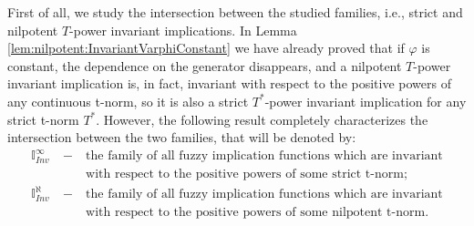 First of all, we study the intersection between the studied families, i.e., strict and nilpotent $T$-power invariant implications. In Lemma \ref{lem:nilpotent:InvariantVarphiConstant} we have already proved that if $\varphi$ is constant, the dependence on the generator disappears, and a nilpotent $T$-power invariant implication is, in fact, invariant with respect to the positive powers of any continuous t-norm, so it is also a strict $T^*$-power invariant implication for any strict t-norm $T^*$. However, the following result completely characterizes the intersection between the two families, that will be denoted by:
\begin{eqnarray*}
	\mathbb{I}^{\infty}_{Inv} &~-~& \text{the family of all fuzzy implication functions which are invariant} \\
	&~~~& \text{with respect to the positive powers of some strict t-norm}; \\
	\mathbb{I}^{\aleph}_{Inv} &~-~& \text{the family of all fuzzy implication functions which are invariant} \\
	&~~~& \text{with respect to the positive powers of some nilpotent t-norm}.
\end{eqnarray*}

